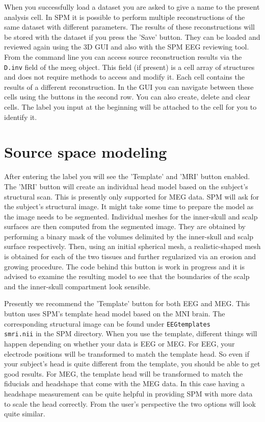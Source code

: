 When you successfully load a dataset you are asked to give a name to the present analysis cell. In SPM it is possible to
perform multiple reconstructions of the same dataset with different parameters. The results of these reconstructions
will be stored with the dataset if you press the 'Save' button. They can be loaded and reviewed again using
the 3D GUI and also with the SPM EEG reviewing tool. From the command line you can access source reconstruction
results via the \texttt{D.inv} field of the meeg object. This field (if present) is a cell array of structures and does not require
methods to access and modify it. Each cell contains the results of a different reconstruction. In the GUI you
can navigate between these cells using the buttons in the second row. You can also create, delete and clear cells.
The label you input at the beginning will be attached to the cell for you to identify it.


\section{Source space modeling}

After entering the label you will see the 'Template' and 'MRI' button enabled. The 'MRI' button will
create an individual head model based on the subject's structural scan. This is presently only supported for MEG
data. SPM will ask for the subject's structural image. It might take some time to prepare the model as the image
 needs to be segmented. Individual meshes for the inner-skull and scalp surfaces are then computed from the
segmented image. They are obtained by performing a binary mask of the volumes
delimited by the inner-skull and scalp surface respectively. Then, using an initial
spherical mesh, a realistic-shaped mesh is obtained for each of the two tissues
and further regularized via an erosion and growing procedure. The code behind this button is work
in progress and it is advised to examine the resulting
model to see that the boundaries of the scalp and the inner-skull compartment look sensible.

Presently we recommend the 'Template' button for both EEG and MEG. This button uses SPM's template head
model based on the MNI brain. The corresponding structural image can be found under \texttt{EEGtemplates\\smri.nii} in the SPM
directory. When you use the template, different things will happen depending on whether your data is EEG or MEG.
For EEG, your electrode positions will be transformed to match the template head. So even if your subject's head
is quite different from the template, you should be able to get good results. For MEG, the template head will
be transformed to match the fiducials and headshape that come with the MEG data. In this case having a headshape
measurement can be quite helpful in providing SPM with more data to scale the head correctly. From the user's
perspective the two options will look quite similar.

